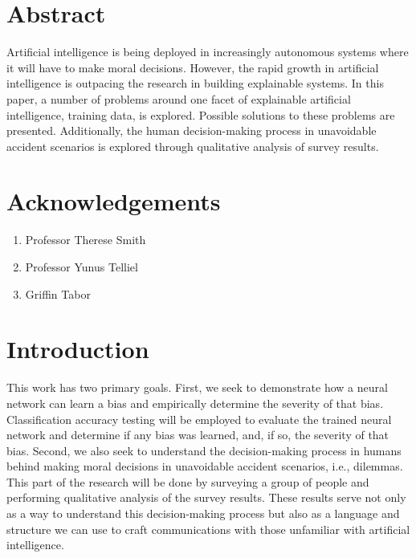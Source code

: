 \documentclass[paper=a4paper]{report}
\begin{document}

\clearpage
\mbox{}
\clearpage

\chapter*{Abstract}

Artificial intelligence is being deployed in increasingly autonomous systems where it will have to
make moral decisions. However, the rapid growth in artificial intelligence is outpacing the research
in building explainable systems. In this paper, a number of problems around one facet of explainable
artificial intelligence, training data, is explored. Possible solutions to these problems are
presented. Additionally, the human decision-making process in unavoidable accident scenarios is
explored through qualitative analysis of survey results.

\chapter*{Acknowledgements}

\begin{enumerate}
    \item Professor Therese Smith
    \item Professor Yunus Telliel
    \item Griffin Tabor
\end{enumerate}

\tableofcontents

\FloatBarrier
\chapter{Introduction}

This work has two primary goals. First, we seek to demonstrate how a neural network can learn a bias
and empirically determine the severity of that bias. Classification accuracy testing will be
employed to evaluate the trained neural network and determine if any bias was learned, and, if so,
the severity of that bias. Second, we also seek to understand the decision-making process in humans
behind making moral decisions in unavoidable accident scenarios, i.e., dilemmas. This part of the
research will be done by surveying a group of people and performing qualitative analysis of the
survey results. These results serve not only as a way to understand this decision-making process but
also as a language and structure we can use to craft communications with those unfamiliar with
artificial intelligence.
\end{document}
